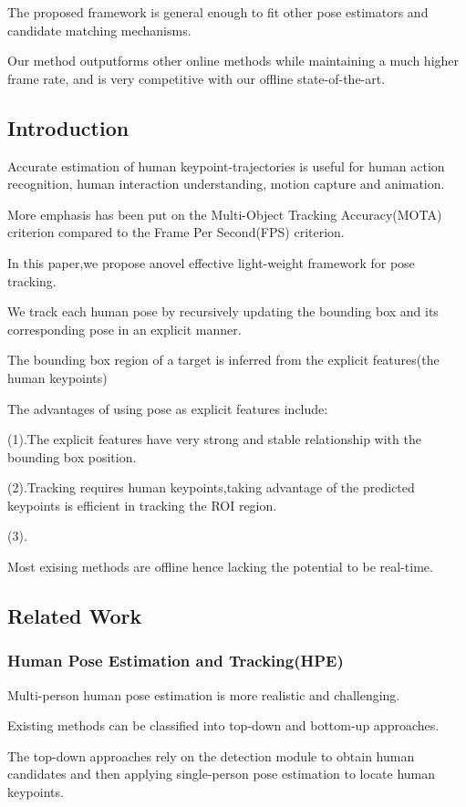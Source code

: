 \documentclass[11pt]{article}
\begin{document}
The proposed framework is general enough to fit other pose estimators and candidate matching mechanisms.

Our method outputforms other online methods while maintaining a much higher frame rate, and is very competitive with our offline state-of-the-art.
\subsection{Introduction}
Accurate estimation of human keypoint-trajectories is useful for human action recognition, human interaction understanding, motion capture and animation.

More emphasis has been put on the Multi-Object Tracking Accuracy(MOTA) criterion compared to the Frame Per Second(FPS) criterion.

In this paper,we propose anovel effective light-weight framework for pose tracking.

We track each human pose by recursively updating the bounding box and its corresponding pose in an explicit manner.

The bounding box region of a target is inferred from the explicit features(the human keypoints)

The advantages of using pose as explicit features include:

(1).The explicit features have very strong and stable relationship with the bounding box position.

(2).Tracking requires human keypoints,taking advantage of the predicted keypoints is efficient in tracking the ROI region.

(3).

Most exising methods are offline hence lacking the potential to be real-time.
\subsection{Related Work}
\subsubsection{Human Pose Estimation and Tracking(HPE)}

Multi-person human pose estimation is more realistic and challenging.

Existing methods can be classified into top-down and bottom-up approaches.

The top-down approaches rely on the detection module to obtain human candidates and then applying single-person pose estimation to locate human keypoints.
\end{document}
